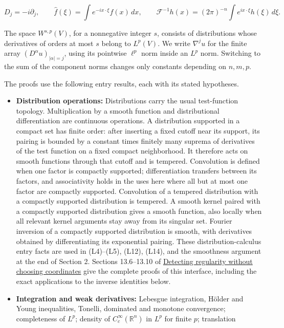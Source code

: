 \documentclass[
  11pt,
]{article}
\providecommand{\tightlist}{%
  \setlength{\itemsep}{0pt}\setlength{\parskip}{0pt}}
\begin{document}
\[
D_j=-i\partial_j,\qquad
\widehat f(\xi)=\int e^{-ix\cdot\xi}f(x)\,dx,\qquad
\mathcal F^{-1}h(x)=(2\pi)^{-n}\int e^{ix\cdot\xi}h(\xi)\,d\xi.
\]

The space \(W^{s,p}(V)\), for a nonnegative integer \(s\), consists of
distributions whose derivatives of orders at most \(s\) belong to
\(L^p(V)\). We write \(\nabla^j u\) for the finite array
\((D^\alpha u)_{|\alpha|=j}\), using its pointwise \(\ell^p\) norm
inside an \(L^p\) norm. Switching to the sum of the component norms
changes only constants depending on \(n,m,p\).

The proofs use the following entry results, each with its stated
hypotheses.

\begin{itemize}
\tightlist
\item
  \textbf{Distribution operations:} Distributions carry the usual
  test-function topology. Multiplication by a smooth function and
  distributional differentiation are continuous operations. A
  distribution supported in a compact set has finite order: after
  inserting a fixed cutoff near its support, its pairing is bounded by a
  constant times finitely many suprema of derivatives of the test
  function on a fixed compact neighborhood. It therefore acts on smooth
  functions through that cutoff and is tempered. Convolution is defined
  when one factor is compactly supported; differentiation transfers
  between its factors, and associativity holds in the uses here where
  all but at most one factor are compactly supported. Convolution of a
  tempered distribution with a compactly supported distribution is
  tempered. A smooth kernel paired with a compactly supported
  distribution gives a smooth function, also locally when all relevant
  kernel arguments stay away from its singular set. Fourier inversion of
  a compactly supported distribution is smooth, with derivatives
  obtained by differentiating its exponential pairing. These
  distribution-calculus entry facts are used in (L4)--(L5), (L12),
  (L14), and the smoothness argument at the end of Section 2. Sections
  13.6--13.10 of \href{geometric-microlocal-calculus.pdf}{Detecting
  regularity without choosing coordinates} give the complete proofs of
  this interface, including the exact applications to the inverse
  identities below.
\item
  \textbf{Integration and weak derivatives:} Lebesgue integration,
  Hölder and Young inequalities, Tonelli, dominated and monotone
  convergence; completeness of \(L^p\); density of
  \(C_c^\infty(\mathbb R^n)\) in \(L^p\) for finite \(p\); translation

\end{itemize}
\end{document}

